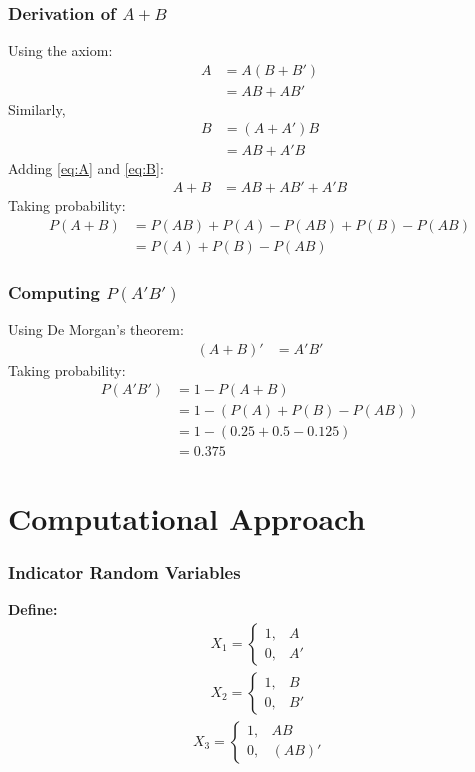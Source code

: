 \documentclass{beamer}
\begin{document}
\begin{frame}
    \frametitle{Derivation of $A + B$}
    Using the axiom:
    \begin{align}
        A &= A(B + B')  \\
        &= AB + AB'  \label{eq:A}
    \end{align}
    Similarly,
    \begin{align}
        B &= (A + A')B  \\
        &= AB + A'B  \label{eq:B}
    \end{align}
    Adding \eqref{eq:A} and \eqref{eq:B}:
    \begin{align}
        A + B &= AB + AB' + A'B
    \end{align}
    Taking probability:
    \begin{align}
        P(A + B) &= P(AB) + P(A) - P(AB) + P(B) - P(AB)\\
        &= P(A) + P(B) - P(AB)
    \end{align}
\end{frame}

\begin{frame}
    \frametitle{Computing $P(A'B')$}
    Using De Morgan's theorem:
    \begin{align}
        (A + B)' &= A' B'
    \end{align}
    Taking probability:
    \begin{align}
        P(A' B') &= 1 - P(A + B)\\
        &= 1 - (P(A) + P(B) - P(AB))\\
        &= 1 - (0.25 + 0.5 - 0.125)\\
        &= 0.375
    \end{align}
\end{frame}

\section{Computational Approach}
\begin{frame}
    \frametitle{Indicator Random Variables}
    \textbf{Define:}
    \begin{align}
        X_1 =
        \begin{cases}
            1 ,& A\\
            0 ,& A'
        \end{cases}
    \end{align}
    \begin{align}
        X_2 =
        \begin{cases}
            1 ,& B\\
            0 ,& B'
        \end{cases}
    \end{align}
    \begin{align}
        X_3 =
        \begin{cases}
            1 ,& AB\\
            0 ,& (AB)'
        \end{cases}
    \end{align}
\end{frame}
\end{document}
